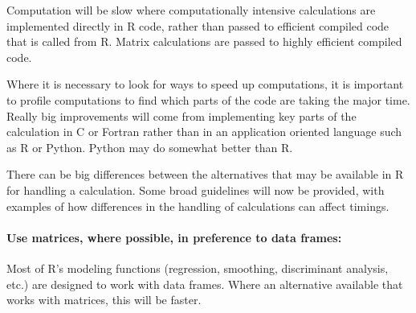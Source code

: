Computation will be slow where computationally intensive calculations
are implemented directly in R code, rather than passed to efficient
compiled code that is called from R.  Matrix calculations are passed
to highly efficient compiled code.

Where
it is necessary to look for ways to speed up computations, it is
important to profile computations to find which parts of the code
are taking the major time.  Really big improvements will come from
implementing key parts of the calculation in C or Fortran rather than
in an application oriented language such as R or Python.  Python may
do somewhat better than R.

There can be big differences between the alternatives that may be
available in R for handling a calculation. Some broad guidelines will
now be provided, with examples of how differences in the handling of
calculations can affect timings.

\paragraph{Use matrices, where possible, in preference to data frames:}

Most
of R's modeling functions (regression, smoothing, discriminant
analysis, etc.) are designed to work with data frames. Where an
alternative available that works with matrices, this will be faster.

